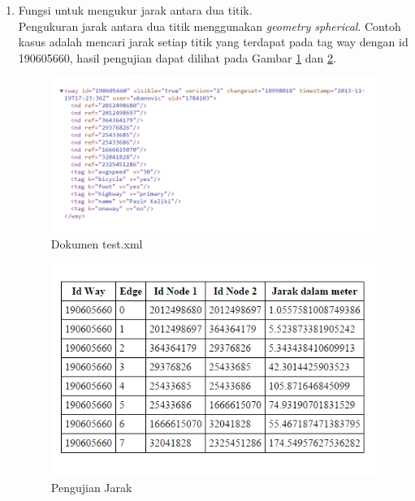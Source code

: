 \begin{enumerate}
  \item Fungsi untuk mengukur jarak antara dua titik.\\
  Pengukuran jarak antara dua titik menggunakan \textit{geometry spherical}.
  Contoh kasus adalah mencari jarak setiap titik yang terdapat pada tag way
  dengan id 190605660, hasil pengujian dapat dilihat pada Gambar
  \ref{fig:pu_jarak1} dan \ref{fig:pu_jarak2}.
\begin{figure}[h]
\centering
\includegraphics[scale=0.7]{Gambar/pu_jarak1}
\caption[Dokumen test.xml]{Dokumen test.xml}
\label{fig:pu_jarak1}
\end{figure}

\begin{figure}[h]
\centering
\includegraphics[scale=1]{Gambar/pu_jarak2}
\caption[Pengujian Jarak]{Pengujian Jarak}
\label{fig:pu_jarak2}
\end{figure}


\end{enumerate}
